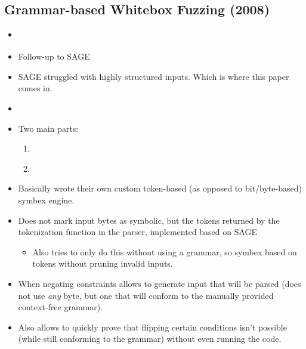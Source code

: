 \documentclass{article}
\begin{document}
\subsection{Grammar-based Whitebox Fuzzing (2008)}
\begin{itemize}
  \item \cite{GrammarBasedWhiteboxFuzzing}
  \item Follow-up to SAGE\cite{SAGE}
  \item SAGE struggled with highly structured inputs. Which is where this paper comes in.
  \item {}\cite{GrammarBasedWhiteboxFuzzing}
  \item Two main parts:
        \begin{enumerate}
          \item {}\cite{GrammarBasedWhiteboxFuzzing}
          \item {}\cite{GrammarBasedWhiteboxFuzzing}
        \end{enumerate}
  \item Basically wrote their own custom token-based (as opposed to bit/byte-based) symbex engine.
  \item Does not mark input bytes as symbolic, but the tokens returned by the tokenization function in the parser, implemented based on SAGE\cite{SAGE}
        \begin{itemize}
          \item Also tries to only do this without using a grammar, so symbex based on tokens without pruning invalid inputs.
        \end{itemize}
  \item When negating constraints allows to generate input that will be parsed (does not use \textit{any} byte, but one that will conform to the manually provided context-free grammar).
  \item Also allows to quickly prove that flipping certain conditions isn't possible (while still conforming to the grammar) without even running the code.

\end{itemize}
\end{document}
